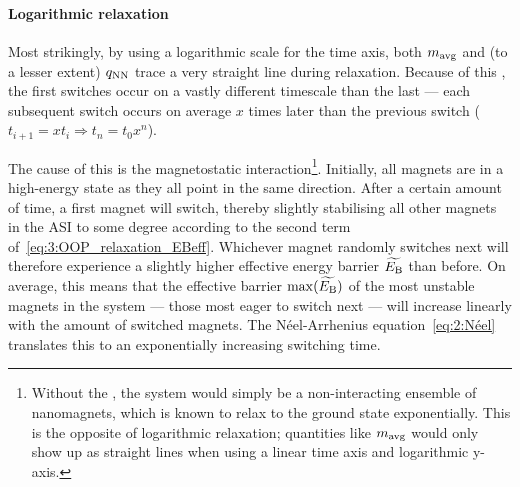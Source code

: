 \paragraph{Logarithmic relaxation}
Most strikingly, by using a logarithmic scale for the time axis, both $m_\mathrm{avg}$ and (to a lesser extent) $q_\mathrm{NN}$ trace a very straight line during relaxation.
Because of this , the first switches occur on a vastly different timescale than the last --- each subsequent switch occurs on average $x$ times later than the previous switch ($t_{i+1} = x t_i \Rightarrow t_n = t_0 x^n$). \par
The cause of this is the magnetostatic interaction\footnote{
	Without the , the system would simply be a non-interacting ensemble of nanomagnets, which is known to relax to the ground state exponentially.
	This is the opposite of logarithmic relaxation; quantities like $m_\mathrm{avg}$ would only show up as straight lines when using a linear time axis and logarithmic y-axis.
}.
Initially, all magnets are in a high-energy state as they all point in the same direction.
After a certain amount of time, a first magnet will switch, thereby slightly stabilising all other magnets in the ASI to some degree according to the second term of~\cref{eq:3:OOP_relaxation_EBeff}.
Whichever magnet randomly switches next will therefore experience a slightly higher effective energy barrier $\widetilde{E_\mathrm{B}}$ than before.
On average, this means that the effective barrier $\max(\widetilde{E_\mathrm{B}})$ of the most unstable magnets in the system --- those most eager to switch next --- will increase linearly with the amount of switched magnets.
The N\'eel-Arrhenius equation~\eqref{eq:2:Néel} translates this to an exponentially increasing switching time. \\\par

